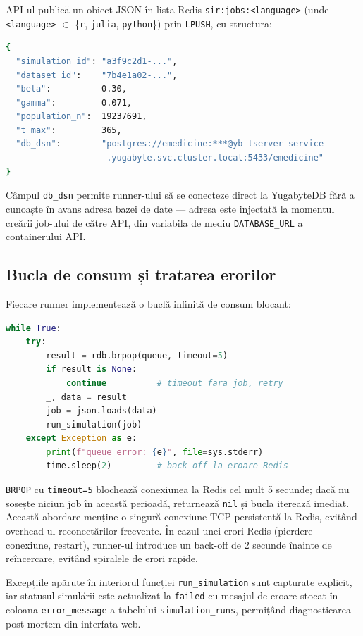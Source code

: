 API-ul publică un obiect JSON în lista Redis \texttt{sir:jobs:<language>}
(unde \texttt{<language>} $\in$ \{\texttt{r}, \texttt{julia}, \texttt{python}\})
prin \texttt{LPUSH}, cu structura:

\begin{lstlisting}[language=bash, caption={Structura mesajului JSON de job publicat de API în coada Redis.}]
{
  "simulation_id": "a3f9c2d1-...",
  "dataset_id":    "7b4e1a02-...",
  "beta":          0.30,
  "gamma":         0.071,
  "population_n":  19237691,
  "t_max":         365,
  "db_dsn":        "postgres://emedicine:***@yb-tserver-service
                    .yugabyte.svc.cluster.local:5433/emedicine"
}
\end{lstlisting}

Câmpul \texttt{db\_dsn} permite runner-ului să se conecteze direct la
YugabyteDB fără a cunoaște în avans adresa bazei de date --- adresa este
injectată la momentul creării job-ului de către API, din variabila de mediu
\texttt{DATABASE\_URL} a containerului API.

\subsection{Bucla de consum și tratarea erorilor}
\label{subsec:consumer_loop}

Fiecare runner implementează o buclă infinită de consum blocant:

\begin{lstlisting}[language=Python, caption={Bucla generică de consum Redis (ilustrată în Python).}]
while True:
    try:
        result = rdb.brpop(queue, timeout=5)
        if result is None:
            continue          # timeout fara job, retry
        _, data = result
        job = json.loads(data)
        run_simulation(job)
    except Exception as e:
        print(f"queue error: {e}", file=sys.stderr)
        time.sleep(2)         # back-off la eroare Redis
\end{lstlisting}

\texttt{BRPOP} cu \texttt{timeout=5} blochează conexiunea la Redis
cel mult 5 secunde; dacă nu sosește niciun job în această perioadă,
returnează \texttt{nil} și bucla iterează imediat. Această abordare
menține o singură conexiune TCP persistentă la Redis, evitând
overhead-ul reconectărilor frecvente. În cazul unei erori Redis
(pierdere conexiune, restart), runner-ul introduce un back-off de 2
secunde înainte de reîncercare, evitând spiralele de erori rapide.

Excepțiile apărute în interiorul funcției \texttt{run\_simulation}
sunt capturate explicit, iar statusul simulării este actualizat la
\texttt{failed} cu mesajul de eroare stocat în coloana
\texttt{error\_message} a tabelului \texttt{simulation\_runs},
permițând diagnosticarea post-mortem din interfața web.
